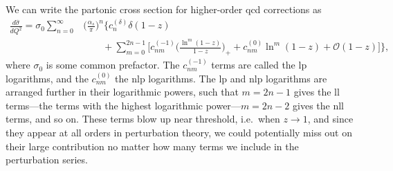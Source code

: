 
We can write the partonic cross section for higher-order \gls{qcd} corrections as~\cite{Braseth:2025ylj}
\begin{equation}
\label{eq:general_resum_xsec}
\begin{split}
    \frac{d\hat\sigma}{dQ^2} = \sigma_0 \sum_{n=0}^\infty &\biggl(\frac{\alpha_s}{\pi}\biggr)^n \Biggl\{
        c_n^{(\delta)}\delta(1-z)
        \\ &\qquad
        + \sum_{m=0}^{2n-1}\Biggl[
            c_{nm}^{(-1)} \biggl(\frac{\ln^m(1-z)}{1-z}\biggr)_{\!\!+}
            + c_{nm}^{(0)} \ln^m(1-z) + \mathcal{O}(1-z)
        \Biggr]
    \Biggr\},
\end{split}
\end{equation}
where $\sigma_0$ is some common prefactor.
The $c_{nm}^{(-1)}$ terms are called the \acrfull{lp} logarithms, and the $c_{nm}^{(0)}$ the \acrfull{nlp} logarithms.
The \gls{lp} and \gls{nlp} logarithms are arranged further in their logarithmic powers, such that $m=2n-1$ gives the \acrfull{ll} terms---the terms with the highest logarithmic power---$m=2n-2$ gives the \acrfull{nll} terms, and so on.
These terms blow up near threshold, i.e.\ when $z\to1$, and since they appear at all orders in perturbation theory, we could potentially miss out on their large contribution no matter how many terms we include in the perturbation series.

